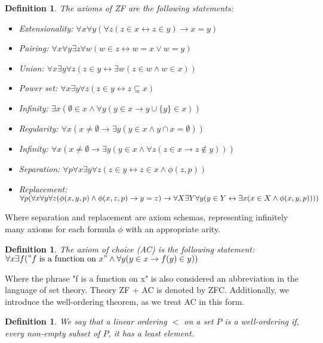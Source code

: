 \documentclass{report}
\newtheorem{dfn}[thm]{Definition}
\begin{document}
\begin{dfn}
  The axioms of ZF are the following statements:
  \begin{itemize}
    \item Extensionality: $\forall x \forall y (\forall z (z \in x \leftrightarrow z \in y) \rightarrow x = y)$
    \item Pairing: $\forall x \forall y \exists z \forall w (w \in z \leftrightarrow w = x \lor w = y)$
    \item Union: $\forall x \exists y \forall z (z \in y \leftrightarrow \exists w (z \in w \land w \in x))$
    \item Power set: $\forall x \exists y \forall z (z \in y \leftrightarrow z \subseteq x)$
    \item Infinity: $\exists x (\emptyset \in x \land \forall y (y \in x \rightarrow y \cup \{y\} \in x))$
    \item Regularity: $\forall x(x \neq \emptyset \rightarrow \exists y (y \in x \land y \cap x = \emptyset))$
    \item Infinity: $\forall x (x \neq \emptyset \rightarrow \exists y (y \in x \land \forall z (z \in x \rightarrow z \notin y)))$
    \item Separation: $\forall p \forall x \exists y \forall z (z \in y \leftrightarrow z \in x \land \phi(z, p))$
    \item Replacement: $\forall p (\forall x \forall y \forall z (\phi(x, y, p) \land \phi(x, z, p) \rightarrow y = z) \rightarrow \\ \forall X \exists Y \forall y (y \in Y \leftrightarrow \exists x (x \in X \land \phi(x, y, p))))$
  \end{itemize}
\end{dfn}
Where separation and replacement are axiom schemas, representing infinitely many axioms for each formula $\phi$ with an appropriate arity.
\begin{dfn} 
  \emph{The axiom of choice (AC)} is the following statement: \\
  $\forall x \exists f (\mathrm{"} f \text{ is a function on } x \mathrm{"} \land \forall y (y \in x \rightarrow f(y) \in y))$
\end{dfn}
Where the phrase "f is a function on x" is also considered an abbreviation in the language of set theory.
Theory ZF + AC is denoted by ZFC.
Additionally, we introduce the well-ordering theorem, as we treat AC in this form.

\begin{dfn}
  We say that a linear ordering $<$ on a set $P$ is a \emph{well-ordering} if, every non-empty subset of $P$, it has a least element.
\end{dfn}
\end{document}
